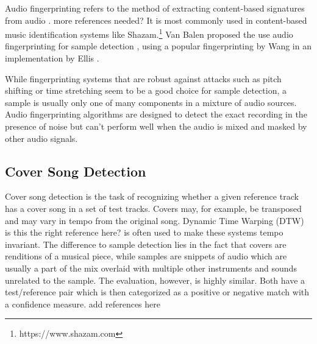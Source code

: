 \documentclass{article}
\begin{document}
Audio fingerprinting refers to the method of extracting content-based signatures from audio \cite{cano2005review}. {\color{red}more references needed?} It is most commonly used in content-based music identification systems like Shazam.\footnote{https://www.shazam.com \color{red}{add access date to all links}}
Van Balen proposed the use audio fingerprinting for sample detection \cite{van2011automatic}, using a popular fingerprinting by Wang \cite{wang2003industrial} in an implementation by Ellis \cite{ellisfinger}. 

While fingerprinting systems that are robust against attacks such as pitch shifting or time stretching seem to be a good choice for sample detection, a sample is usually only one of many components in a mixture of audio sources. Audio fingerprinting algorithms are designed to detect the exact recording in the presence of noise but can't perform well when the audio is mixed and masked by other audio signals.

\subsection{Cover Song Detection}
Cover song detection is the task of recognizing whether a given reference track has a cover song in a set of test tracks\cite{Ellis2007Cover,serracover,bertin2011large}.
Covers may, for example, be transposed and may vary in tempo from the original song. Dynamic Time Warping (DTW) \cite{berndt1994using} {\color{red}is this the right reference here?} is often used to make these systems tempo invariant. The difference to sample detection lies in the fact that covers are renditions of a musical piece, while samples are snippets of audio which are usually a part of the mix overlaid with multiple other instruments and sounds unrelated to the sample.
%
The evaluation, however, is highly similar. Both have a test/reference pair which is then categorized as a positive or negative match with a confidence measure. {\color{red}add references here}
\end{document}
